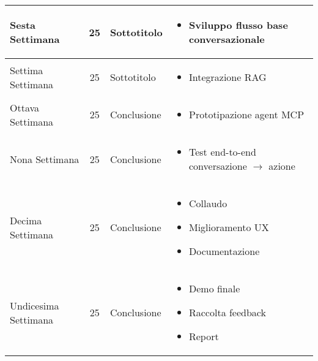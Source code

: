 \begin{table}[H]
\begin{tabularx}{\textwidth}{|@{} l c l >{\raggedright\arraybackslash}X|}
        Sesta Settimana & 25 & Sottotitolo & 
            \begin{itemize}
            \item Sviluppo flusso base conversazionale
            \end{itemize} \\
            \hline
        Settima Settimana & 25 & Sottotitolo & 
            \begin{itemize}
            \item Integrazione RAG
            \end{itemize} \\
            \hline
        Ottava Settimana & 25 & Conclusione & 
            \begin{itemize}
            \item Prototipazione agent MCP
            \end{itemize} \\
            \hline
        Nona Settimana & 25 & Conclusione & 
            \begin{itemize}
            \item Test end-to-end conversazione $\rightarrow$ azione
            \end{itemize} \\
            \hline
        Decima Settimana & 25 & Conclusione & 
            \begin{itemize}
            \item Collaudo
            \item Miglioramento UX
            \item Documentazione
            \end{itemize} \\
            \hline
        Undicesima Settimana & 25 & Conclusione & 
            \begin{itemize}
            \item Demo finale
            \item Raccolta feedback
            \item Report
            \end{itemize} \\
            \hline
    \end{tabularx}
\end{table}


